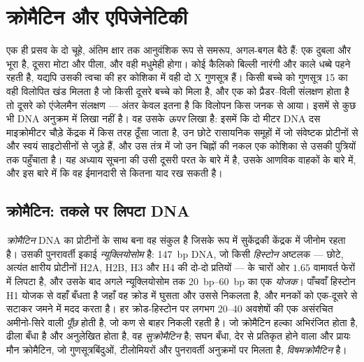 \chapter{क्रोमैटिन और एपिजेनेटिकी}\label{ch:b3:chromatin-epigenetics}

एक ही प्रसव के दो चूहे, अंतिम क्षार तक आनुवंशिक रूप से समरूप, अगल-बगल
बैठे हैं: एक दुबला और भूरा है, दूसरा मोटा और पीला, और वही मधुमेही
होगा। कोई कैलिको बिल्ली नारंगी और काले धब्बे पहने रहती है, यद्यपि उसकी
त्वचा की हर कोशिका में वही दो X गुणसूत्र हैं। किसी बच्चे को गुणसूत्र 15
का वही विलोपित खंड मिलता है जो किसी दूसरे बच्चे को मिला है, और एक को
प्रैडर--विली संलक्षण होता है तो दूसरे को एंजेलमैन संलक्षण --- अंतर केवल
इतना है कि विलोपन किस जनक से आया। इसमें से कुछ भी DNA अनुक्रम में लिखा
नहीं है। वह उसके \emph{ऊपर} लिखा है: इसमें कि दो मीटर DNA दस
माइक्रोमीटर चौड़े केंद्रक में किस तरह ठूँसा जाता है, उन छोटे रासायनिक
समूहों में जो संवेष्टक प्रोटीनों से और स्वयं साइटोसीनों से जुड़े हैं,
और उस तंत्र में जो उन चिह्नों की नकल एक कोशिका से उसकी पुत्रियों तक
पहुँचाता है। यह अध्याय सूचना की उसी दूसरी परत के बारे में है, उसके
आणविक वाहकों के बारे में, और इस बारे में कि वह ईमानदारी से कितना याद
रख सकती है।

\section{क्रोमैटिन: तकले पर लिपटा DNA}

\begin{definition}[न्यूक्लियोसोम और क्रोमैटिन]\label{def:b3:chromatin-epigenetics:nucleosome}
\emph{क्रोमैटिन} DNA का प्रोटीनों के साथ बना वह संकुल है जिसके रूप में
सुकेंद्रकी केंद्रक में जीनोम रहता है। उसकी पुनरावर्ती इकाई
\emph{न्यूक्लियोसोम} है: \qty{147}{bp} DNA, जो किसी \emph{हिस्टोन}
अष्टलक --- छोटे, अत्यंत क्षारीय प्रोटीनों H2A, H2B, H3 और H4 की दो-दो
प्रतियों --- के चारों ओर $1.65$ वामावर्त फेरों में लिपटा है, और उसके
बाद अगले न्यूक्लियोसोम तक \qtyrange{20}{60}{bp} का एक \emph{योजक}।
पाँचवाँ हिस्टोन H1 योजक से वहाँ बँधता है जहाँ वह क्रोड में घुसता और
उससे निकलता है, और मनकों को एक-दूसरे से सटाकर जमने में मदद करता है। हर
क्रोड-हिस्टोन पर लगभग \numrange{20}{40} अवशेषों की एक असंरचित
अमीनो-सिरे वाली \emph{पूँछ} होती है, जो कण से बाहर निकली रहती है। जो
क्रोमैटिन हल्का अभिरंजित होता है, ढीला बँधा है और अनुलेखित होता है, वह
\emph{सुक्रोमैटिन} है; सघन बँधा, देर से प्रतिकृत होने वाला और प्रायः
मौन क्रोमैटिन, जो गुणसूत्रबिंदुओं, टीलोमियरों और पुनरावर्ती अनुक्रमों
पर मिलता है, \emph{विषमक्रोमैटिन} है।
\end{definition}

